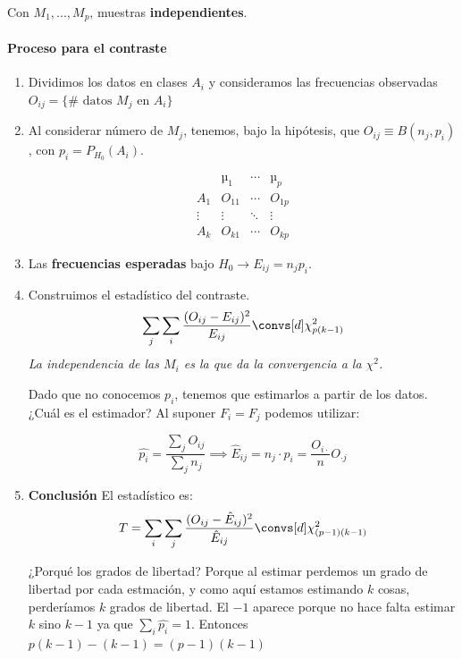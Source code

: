 Con $M_1,...,M_p$, muestras \textbf{independientes}.

\paragraph{Proceso para el contraste}
\begin{enumerate}

\label{contraste::homogeneidad::chicuadrado}

\item Dividimos los datos en clases $A_i$ y consideramos las frecuencias observadas $O_{ij} = \{\#\text{ datos } M_j \text{ en } A_i \}$

\item Al considerar número de $M_j$, tenemos, bajo la hipótesis, que $O_{ij} \equiv B(n_j,p_i)$, con $p_i = P_{H_0}(A_i)$.

\begin{defn}
\[
\begin{array}{c|ccc}
&µ_1&\cdots & µ_p \\\hline
A_1 & O_{11} & \cdots & O_{1p}\\
\vdots & \vdots & \ddots & \vdots \\
A_k & O_{k1} & \cdots & O_{kp} 
\end{array}
\]
\end{defn}

\item Las \textbf{frecuencias esperadas} bajo $H_0 \to E_{ij} = n_jp_i$.

\item Construimos el estadístico del contraste. \[\sum_j \sum_i \frac{(O_{ij} - E_{ij})^2}{E_{ij}} \convs[d] \chi^2_{p(k-1)}\]
\subitem \textit{La independencia de las $M_i$ es la que da la convergencia a la $\chi^2$.}

\subitem Dado que no conocemos $p_i$, tenemos que estimarlos a partir de los datos. ¿Cuál es el estimador? Al suponer $F_i = F_j$ podemos utilizar:

\[ \hat{p_i} = \frac{\sum_j O_{ij}}{\sum_j n_j} \implies \hat{E}_{ij} = n_j·p_i = \frac{O_{i·}}{n}O_{·j}\]

\item \textbf{Conclusión} El estadístico es: \[T = \sum_i \sum_j \frac{(O_{ij} - \hat{E}_{ij})^2}{\hat{E}_{ij}} \convs[d] \chi^2_{(p-1)(k-1)} \] 

\subitem ¿Porqué los grados de libertad? Porque al estimar perdemos un grado de libertad por cada estmación, y como aquí estamos estimando $k$ cosas, perderíamos $k$ grados de libertad. El $-1$ aparece porque no hace falta estimar $k$ sino $k-1$ ya que $\sum_i \hat{p_i} = 1$. Entonces $p(k-1) - (k-1) = (p-1)(k-1)$


\end{enumerate}
